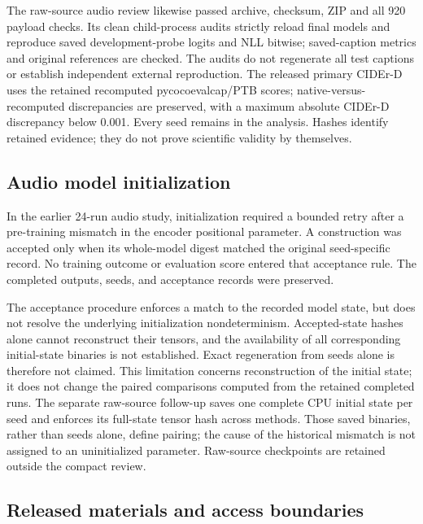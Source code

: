 \documentclass[10pt,a4paper,twocolumn]{article}
\begin{document}
The raw-source audio review likewise passed archive, checksum, ZIP and
all 920 payload checks. Its clean child-process audits strictly reload
final models and reproduce saved development-probe logits and NLL
bitwise; saved-caption metrics and original references are checked.
The audits do not regenerate all test captions or establish independent
external reproduction. The released primary CIDEr-D uses the retained
recomputed pycocoevalcap/PTB scores; native-versus-recomputed discrepancies
are preserved, with a maximum absolute CIDEr-D discrepancy below 0.001.
Every seed remains in the analysis. Hashes identify retained evidence;
they do not prove scientific validity by themselves.

\subsection{Audio model initialization}
\label{app:audio_initialization}

In the earlier 24-run audio study, initialization required a bounded retry after a pre-training
mismatch in the encoder positional parameter. A construction was
accepted only when its whole-model digest matched the original
seed-specific record. No training outcome or evaluation score entered
that acceptance rule. The completed outputs, seeds, and acceptance
records were preserved.

The acceptance procedure enforces a match to the recorded model state,
but does not resolve the underlying initialization nondeterminism.
Accepted-state hashes alone cannot reconstruct their tensors, and the
availability of all corresponding initial-state binaries is not
established. Exact regeneration from seeds alone is therefore not
claimed. This limitation concerns reconstruction of the initial state;
it does not change the paired comparisons computed from the retained
completed runs. The separate raw-source follow-up saves one complete
CPU initial state per seed and enforces its full-state tensor hash across
methods. Those saved binaries, rather than seeds alone, define pairing;
the cause of the historical mismatch is not assigned to an uninitialized
parameter. Raw-source checkpoints are retained outside the compact review.

\subsection{Released materials and access boundaries}
\label{app:artifact_availability}
\end{document}
